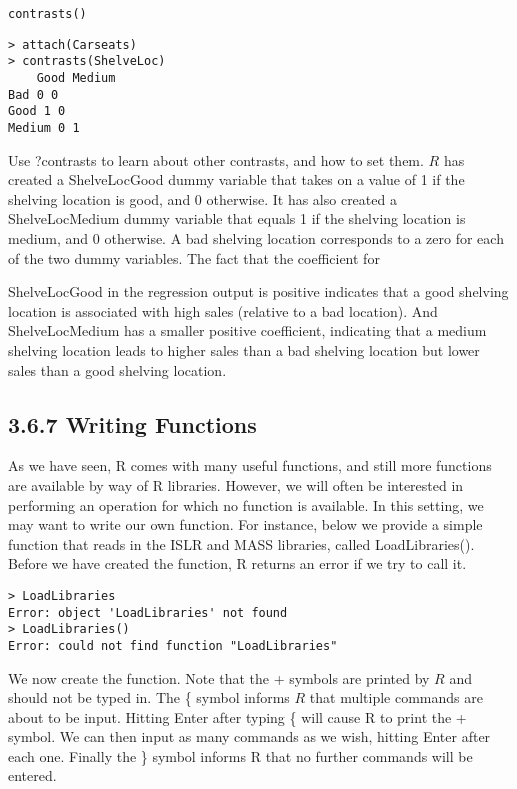 \documentclass[10pt]{article}
\begin{document}
\begin{verbatim}
contrasts()
\end{verbatim}

\begin{verbatim}
> attach(Carseats)
> contrasts(ShelveLoc)
    Good Medium
Bad 0 0
Good 1 0
Medium 0 1
\end{verbatim}

Use ?contrasts to learn about other contrasts, and how to set them. $R$ has created a ShelveLocGood dummy variable that takes on a value of 1 if the shelving location is good, and 0 otherwise. It has also created a ShelveLocMedium dummy variable that equals 1 if the shelving location is medium, and 0 otherwise. A bad shelving location corresponds to a zero for each of the two dummy variables. The fact that the coefficient for


ShelveLocGood in the regression output is positive indicates that a good shelving location is associated with high sales (relative to a bad location). And ShelveLocMedium has a smaller positive coefficient, indicating that a medium shelving location leads to higher sales than a bad shelving location but lower sales than a good shelving location.

\subsection*{3.6.7 Writing Functions}
As we have seen, R comes with many useful functions, and still more functions are available by way of R libraries. However, we will often be interested in performing an operation for which no function is available. In this setting, we may want to write our own function. For instance, below we provide a simple function that reads in the ISLR and MASS libraries, called LoadLibraries(). Before we have created the function, R returns an error if we try to call it.

\begin{verbatim}
> LoadLibraries
Error: object 'LoadLibraries' not found
> LoadLibraries()
Error: could not find function "LoadLibraries"
\end{verbatim}

We now create the function. Note that the + symbols are printed by $R$ and should not be typed in. The \{ symbol informs $R$ that multiple commands are about to be input. Hitting Enter after typing \{ will cause R to print the + symbol. We can then input as many commands as we wish, hitting Enter after each one. Finally the \} symbol informs R that no further commands will be entered.
\end{document}
